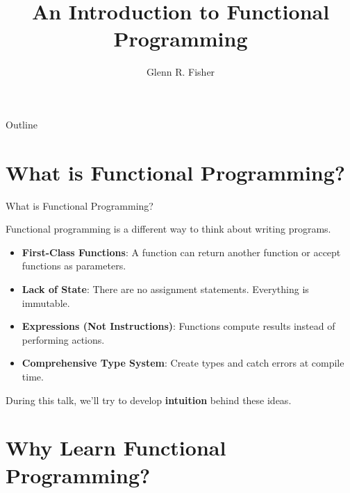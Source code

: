 \documentclass[8pt,aspectratio=169]{beamer}
\title{An Introduction to Functional Programming}
\author{Glenn R. Fisher}
\institute[IBM Mobile Innovation Lab] %
\begin{document}
\begin{frame}
  \titlepage
\end{frame}

\begin{frame}{Outline}
\end{frame}


\section{What is Functional Programming?}


\begin{frame}{What is Functional Programming?}

\pause
Functional programming is a different way to think about writing programs.
\newline

\begin{itemize}
\item \pause
  \textbf{First-Class Functions}: A function can return another function or accept functions as parameters.
\item \pause
  \textbf{Lack of State}: There are no assignment statements. Everything is immutable.
\item \pause
  \textbf{Expressions (Not Instructions)}: Functions compute results instead of performing actions.
\item \pause
  \textbf{Comprehensive Type System}: Create types and catch errors at compile time.
\end{itemize}

\vspace{5mm}

\pause
During this talk, we'll try to develop \textbf{intuition} behind these ideas.

\end{frame}


\section{Why Learn Functional Programming?}
\end{document}
